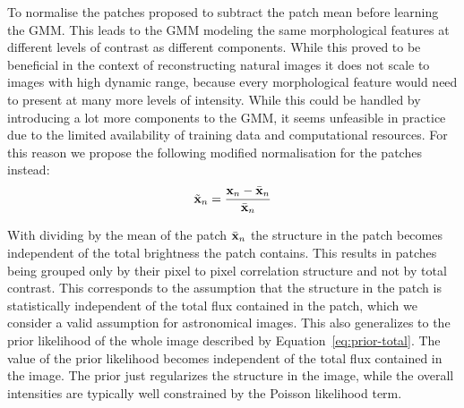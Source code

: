 \documentclass[twocolumn]{aastex631}
\DeclareMathOperator{\arcsinh}{arcsinh}
\begin{document}
    To normalise the patches \cite{Zoran2011} proposed to subtract the patch mean before learning the GMM. This leads to the GMM modeling the same morphological features at different levels of contrast as different components. While this proved to be beneficial in the context of reconstructing natural images it does not scale to images with high dynamic range, because every morphological feature would need to present at many more levels of intensity. While this could be handled by introducing a lot more components to the GMM, it seems unfeasible in practice due to the limited availability of training data and computational resources. For this reason we propose the following modified normalisation for the patches instead:
    \begin{equation}
        \label{eq:patch-norm}
        \tilde{\mathbf{x}}_n = \frac{\mathbf{x}_n - \Bar{\mathbf{x}}_n}{\Bar{\mathbf{x}}_n}
    \end{equation}
    
    With dividing by the mean of the patch $\Bar{\mathbf{x}}_n$ the structure in the patch becomes independent of the total brightness the patch contains. This results in patches being grouped only by their pixel to pixel correlation structure and not by total contrast. This corresponds to the assumption that the structure in the patch is statistically independent of the total flux contained in the patch, which we consider a valid assumption for astronomical images. This also generalizes to the prior likelihood of the whole image described by Equation~\ref{eq:prior-total}. The value of the prior likelihood becomes independent of the total flux contained in the image. The prior just regularizes the structure in the image, while the overall intensities are typically well constrained by the Poisson likelihood term. 
    


\end{document}
